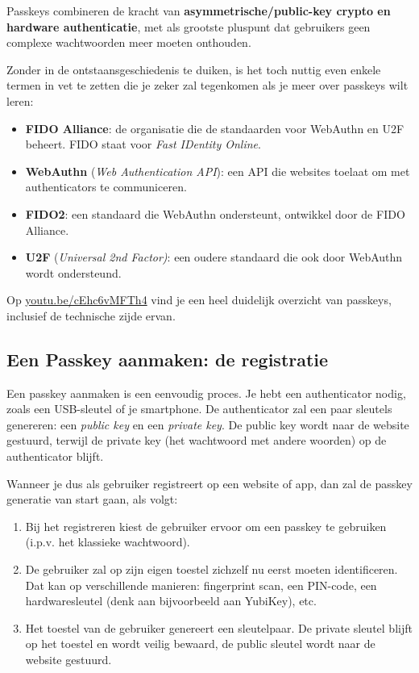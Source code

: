 \documentclass[
  10pt,
  dutch,
  paper=a4,
  ,captions=tableheading
]{scrbook}
\providecommand{\tightlist}{%
  \setlength{\itemsep}{0pt}\setlength{\parskip}{0pt}}
\begin{document}
Passkeys combineren de kracht van \textbf{asymmetrische/public-key
crypto en hardware authenticatie}, met als grootste pluspunt dat
gebruikers geen complexe wachtwoorden meer moeten onthouden.

Zonder in de ontstaansgeschiedenis te duiken, is het toch nuttig even
enkele termen in vet te zetten die je zeker zal tegenkomen als je meer
over passkeys wilt leren:

\begin{itemize}
\tightlist
\item
  \textbf{FIDO Alliance}: de organisatie die de standaarden voor
  WebAuthn en U2F beheert. FIDO staat voor \emph{Fast IDentity Online}.
\item
  \textbf{WebAuthn} (\emph{Web Authentication API}): een API die
  websites toelaat om met authenticators te communiceren.
\item
  \textbf{FIDO2}: een standaard die WebAuthn ondersteunt, ontwikkel door
  de FIDO Alliance.
\item
  \textbf{U2F} (\emph{Universal 2nd Factor)}: een oudere standaard die
  ook door WebAuthn wordt ondersteund.
\end{itemize}

\begin{tipblock}
Op \href{https://youtu.be/cEhc6vMFTh4}{youtu.be/cEhc6vMFTh4} vind je een
heel duidelijk overzicht van passkeys, inclusief de technische zijde
ervan.
\end{tipblock}

\subsection{Een Passkey aanmaken: de
registratie}\label{een-passkey-aanmaken-de-registratie}

Een passkey aanmaken is een eenvoudig proces. Je hebt een authenticator
nodig, zoals een USB-sleutel of je smartphone. De authenticator zal een
paar sleutels genereren: een \emph{public key} en een \emph{private
key}. De public key wordt naar de website gestuurd, terwijl de private
key (het wachtwoord met andere woorden) op de authenticator blijft.

Wanneer je dus als gebruiker registreert op een website of app, dan zal
de passkey generatie van start gaan, als volgt:

\begin{enumerate}
\def\labelenumi{\arabic{enumi}.}
\tightlist
\item
  Bij het registreren kiest de gebruiker ervoor om een passkey te
  gebruiken (i.p.v. het klassieke wachtwoord).
\item
  De gebruiker zal op zijn eigen toestel zichzelf nu eerst moeten
  identificeren. Dat kan op verschillende manieren: fingerprint scan,
  een PIN-code, een hardwaresleutel (denk aan bijvoorbeeld aan YubiKey),
  etc.
\item
  Het toestel van de gebruiker genereert een sleutelpaar. De private
  sleutel blijft op het toestel en wordt veilig bewaard, de public
  sleutel wordt naar de website gestuurd.
\end{enumerate}
\end{document}
